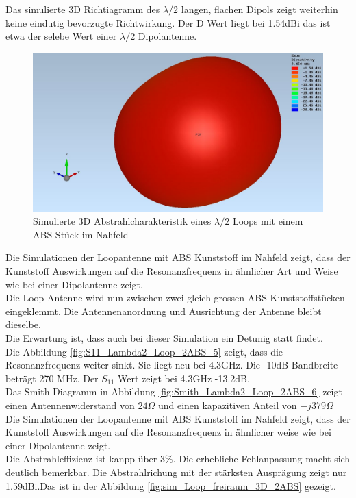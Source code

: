 Das simulierte 3D Richtiagramm des $\lambda/2$ langen, flachen Dipols zeigt weiterhin keine eindutig bevorzugte Richtwirkung. Der D Wert liegt bei 1.54dBi das ist etwa der selebe Wert einer $\lambda/2$ Dipolantenne. 
\begin{figure}[h]
	\centering
	\includegraphics[width=13cm]{content/bilder/Evaluation/Loop/L2/1ABS/EM_Far_Field_Loop_Lambda2_mitABS.JPG}%
	\caption{Simulierte 3D Abstrahlcharakteristik eines $\lambda/2$ Loops mit einem ABS Stück im Nahfeld}
	\label{fig:sim_Loop_freiraum_3D_1ABS}
\end{figure}


\newpage
Die Simulationen der Loopantenne mit ABS Kunststoff im Nahfeld  zeigt, dass der Kunststoff  Auswirkungen auf die Resonanzfrequenz in ähnlicher Art und Weise wie bei einer Dipolantenne zeigt.\\

Die Loop Antenne wird nun zwischen zwei gleich grossen ABS Kunststoffstücken eingeklemmt. Die Antennenanordnung und Ausrichtung der Antenne bleibt dieselbe. \\
Die Erwartung ist, dass auch bei dieser Simulation ein Detunig statt findet.\\ 

Die Abbildung \ref{fig:S11_Lambda2_Loop_2ABS_5} zeigt, dass die Resonanzfrequenz weiter sinkt. Sie liegt neu bei 4.3GHz. Die -10dB Bandbreite beträgt 270 MHz. Der $S_{11}$ Wert zeigt bei 4.3GHz -13.2dB.\\
Das Smith Diagramm in Abbildung \ref{fig:Smith_Lambda2_Loop_2ABS_6} zeigt einen Antennenwiderstand von $24\Omega$ und einen kapazitiven Anteil von $-j379\Omega$\\
Die Simulationen der Loopantenne mit ABS Kunststoff im Nahfeld  zeigt, dass der Kunststoff  Auswirkungen auf die Resonanzfrequenz in ähnlicher weise wie bei einer Dipolantenne zeigt.\\
Die Abstrahleffizienz ist kanpp über $3\%$. Die erhebliche Fehlanpassung macht sich deutlich bemerkbar. Die Abstrahlrichung mit der stärksten Ausprägung zeigt nur 1.59dBi.Das ist in der Abbildung \ref{fig:sim_Loop_freiraum_3D_2ABS} gezeigt.



